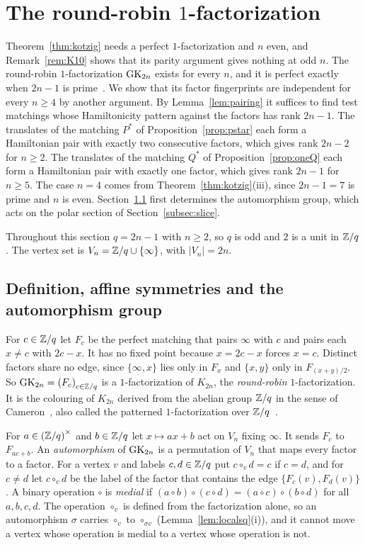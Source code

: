 \section{The round-robin \texorpdfstring{$1$}{1}-factorization}\label{sec:roundrobin}

Theorem~\ref{thm:kotzig} needs a perfect $1$-factorization and $n$ even, and Remark~\ref{rem:K10} shows that its parity argument gives nothing at odd $n$. The round-robin $1$-factorization $\mathrm{GK}_{2n}$ exists for every $n$, and it is perfect exactly when $2n-1$ is prime~\cite[Thm.~2.1]{Cameron75}. We show that its factor fingerprints are independent for every $n\ge4$ by another argument. By Lemma~\ref{lem:pairing} it suffices to find test matchings whose Hamiltonicity pattern against the factors has rank $2n-1$. The translates of the matching $P^*$ of Proposition~\ref{prop:pstar} each form a Hamiltonian pair with exactly two consecutive factors, which gives rank $2n-2$ for $n\ge2$. The translates of the matching $Q^*$ of Proposition~\ref{prop:oneQ} each form a Hamiltonian pair with exactly one factor, which gives rank $2n-1$ for $n\ge5$. The case $n=4$ comes from Theorem~\ref{thm:kotzig}(iii), since $2n-1=7$ is prime and $n$ is even. Section~\ref{subsec:aut} first determines the automorphism group, which acts on the polar section of Section~\ref{subsec:slice}.

Throughout this section $q=2n-1$ with $n\ge2$, so $q$ is odd and $2$ is a unit in $\mathbb{Z}/q$. The vertex set is $V_n=\mathbb{Z}/q\cup\{\infty\}$, with $|V_n|=2n$.

\subsection{Definition, affine symmetries and the automorphism group}\label{subsec:aut}

For $c\in\mathbb{Z}/q$ let $F_c$ be the perfect matching that pairs $\infty$ with $c$ and pairs each $x\ne c$ with $2c-x$. It has no fixed point because $x=2c-x$ forces $x=c$. Distinct factors share no edge, since $\{\infty,x\}$ lies only in $F_x$ and $\{x,y\}$ only in $F_{(x+y)/2}$. So $\mathrm{GK}_{2n}={(F_c)}_{c\in\mathbb{Z}/q}$ is a $1$-factorization of $K_{2n}$, the \emph{round-robin} $1$-factorization. It is the colouring of $K_{2n}$ derived from the abelian group $\mathbb{Z}/q$ in the sense of Cameron~\cite[\S2]{Cameron75}, also called the patterned $1$-factorization over $\mathbb{Z}/q$~\cite{Traetta13}.

For $a\in{(\mathbb{Z}/q)}^\times$ and $b\in\mathbb{Z}/q$ let $x\mapsto ax+b$ act on $V_n$ fixing $\infty$. It sends $F_c$ to $F_{ac+b}$. An \emph{automorphism} of $\mathrm{GK}_{2n}$ is a permutation of $V_n$ that maps every factor to a factor. For a vertex $v$ and labels $c,d\in\mathbb{Z}/q$ put $c\circ_{v}d=c$ if $c=d$, and for $c\ne d$ let $c\circ_{v}d$ be the label of the factor that contains the edge $\{F_c(v),F_d(v)\}$. A binary operation $\circ$ is \emph{medial} if $(a\circ b)\circ(c\circ d)=(a\circ c)\circ(b\circ d)$ for all $a,b,c,d$. The operation $\circ_v$ is defined from the factorization alone, so an automorphism $\sigma$ carries $\circ_v$ to $\circ_{\sigma v}$ (Lemma~\ref{lem:localsq}(i)), and it cannot move a vertex whose operation is medial to a vertex whose operation is not.

